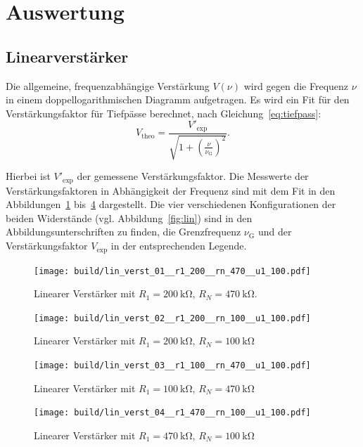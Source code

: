\section{Auswertung}%
\label{sec:auswertung}
\subsection{Linearverst\"arker}
Die allgemeine, frequenzabhängige Verstärkung $V\!\left(\nu\right)$ wird gegen die Frequenz $\nu$ in einem doppellogarithmischen Diagramm aufgetragen.
Es wird ein Fit für den Verstärkungsfaktor für Tiefpässe berechnet, nach
Gleichung~\eqref{eq:tiefpass}:
\begin{equation}\label{eq:fit_tiefpass}
  V_\text{theo} = \frac{V'_{\text{exp}}}{\sqrt{1 + {\left({\frac{\nu}{\nu_\text{G}}}\right)}^{2}}}.
\end{equation}

Hierbei ist $V'_{\text{exp}}$ der gemessene Verstärkungsfaktor.
Die Messwerte der Verstärkungsfaktoren in Abhängigkeit der Frequenz
sind mit dem Fit in den Abbildungen~\ref{fig:lin_verst_01} bis~\ref{fig:lin_verst_04} dargestellt.
Die vier verschiedenen Konfigurationen der beiden Widerstände (vgl. Abbildung~\ref{fig:lin})
sind in den Abbildungsunterschriften zu finden,
die Grenzfrequenz $\nu_\text{G}$ und der Verstärkungsfaktor $V_\text{exp}$ in der entsprechenden Legende.

\begin{figure}[ht]
  \centering
  \texttt{[image: build/lin\_verst\_01\_\_r1\_200\_\_rn\_470\_\_u1\_100.pdf]}
  \caption{Linearer Verstärker mit $R_1 = \SI{200}{\kilo\ohm}$, $R_N = \SI{470}{\kilo\ohm}$.}
  \label{fig:lin_verst_01}
\end{figure}

\begin{figure}[ht]
  \centering
  \texttt{[image: build/lin\_verst\_02\_\_r1\_200\_\_rn\_100\_\_u1\_100.pdf]}
  \caption{Linearer Verst\"arker mit $R_1 = \SI{200}{\kilo\ohm}$, $R_N = \SI{100}{\kilo\ohm}$}
  \label{fig:lin_verst_02}
\end{figure}

\begin{figure}[ht]
  \centering
  \texttt{[image: build/lin\_verst\_03\_\_r1\_100\_\_rn\_470\_\_u1\_100.pdf]}
  \caption{Linearer Verst\"arker mit $R_1 = \SI{100}{\kilo\ohm}$, $R_N = \SI{470}{\kilo\ohm}$}
  \label{fig:lin_verst_03}
\end{figure}

\begin{figure}[ht]
  \centering
  \texttt{[image: build/lin\_verst\_04\_\_r1\_470\_\_rn\_100\_\_u1\_100.pdf]}
  \caption{Linearer Verst\"arker mit $R_1 = \SI{470}{\kilo\ohm}$, $R_N = \SI{100}{\kilo\ohm}$}
  \label{fig:lin_verst_04}
\end{figure}

